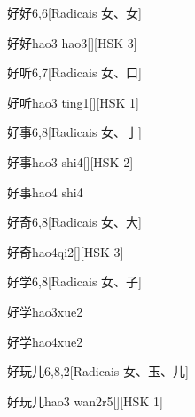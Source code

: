 \begin{entry}{好好}{6,6}[Radicais ⼥、⼥]
  \begin{phonetics}{好好}{hao3 hao3}[][HSK 3]
  \end{phonetics}
\end{entry}

\begin{entry}{好听}{6,7}[Radicais ⼥、⼝]
  \begin{phonetics}{好听}{hao3 ting1}[][HSK 1]
  \end{phonetics}
\end{entry}

\begin{entry}{好事}{6,8}[Radicais ⼥、⼅]
  \begin{phonetics}{好事}{hao3 shi4}[][HSK 2]
  \end{phonetics}
  \begin{phonetics}{好事}{hao4 shi4}
  \end{phonetics}
\end{entry}

\begin{entry}{好奇}{6,8}[Radicais ⼥、⼤]
  \begin{phonetics}{好奇}{hao4qi2}[][HSK 3]
  \end{phonetics}
\end{entry}

\begin{entry}{好学}{6,8}[Radicais ⼥、⼦]
  \begin{phonetics}{好学}{hao3xue2}
  \end{phonetics}
  \begin{phonetics}{好学}{hao4xue2}
  \end{phonetics}
\end{entry}

\begin{entry}{好玩儿}{6,8,2}[Radicais ⼥、⽟、⼉]
  \begin{phonetics}{好玩儿}{hao3 wan2r5}[][HSK 1]
  \end{phonetics}
\end{entry}

